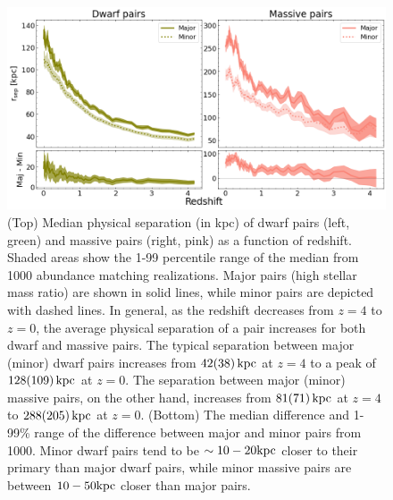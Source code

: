 \documentclass[twocolumn]{aastex631}
\begin{document}
\begin{figure}[htp]
  \centering
  \includegraphics[width=\textwidth]{sep_1000.png}
  \caption{(Top) Median physical separation (in kpc) of dwarf pairs (left, green) and massive pairs (right, pink) as a function of redshift. 
  Shaded areas show the 1-99 percentile range of the median from 1000 abundance matching realizations. 
  Major pairs (high stellar mass ratio) are shown in solid lines, while minor pairs are depicted with dashed lines.
  In general, as the redshift decreases from $z=4$ to $z=0$, the average physical separation of a pair increases for both dwarf and massive pairs. 
  The typical separation between major (minor) dwarf pairs increases from $42(38)\,\mathrm{kpc}$ at $z=4$ to a peak of $128(109)\,\mathrm{kpc}$ at $z=0$.
  The separation between major (minor) massive pairs, on the other hand, increases from $81(71)\,\mathrm{kpc}$ at $z=4$ to $288(205)\,\mathrm{kpc}$ at  $z=0$.
  (Bottom) The median difference and 1-99\% range of the difference between major and minor pairs from 1000.
  Minor dwarf pairs tend to be $\sim10-20\mathrm{kpc}$ closer to their primary than major dwarf pairs, while minor massive pairs are between $10-50\mathrm{kpc}$ closer than major pairs. 
    }
  \label{fig:sep}
\end{figure}
\end{document}
